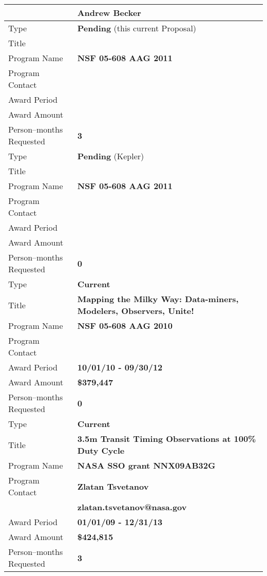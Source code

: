 

\begin{tabular}{lp{3.5in}}
 & {\bf Andrew Becker} \\
\hline

Type & {\bf Pending} (this current Proposal) \\
Title & \\
Program Name & {\bf NSF 05-608 AAG 2011} \\
Program Contact &  \\
Award Period &  \\
Award Amount &  \\
Person--months Requested & {\bf 3} \\
\hline

Type & {\bf Pending} (Kepler) \\
Title & \\
Program Name & {\bf NSF 05-608 AAG 2011} \\
Program Contact & \\
Award Period &  \\
Award Amount &  \\
Person--months Requested & {\bf 0} \\
\hline

Type & {\bf Current}\\
Title & {\bf Mapping the Milky Way: Data-miners, Modelers, Observers, Unite!} \\
Program Name & {\bf NSF 05-608 AAG 2010} \\
Program Contact & \\
Award Period & {\bf 10/01/10 - 09/30/12} \\
Award Amount & {\bf \$379,447} \\
Person--months Requested & {\bf 0} \\
\hline

Type & {\bf Current} \\
Title & {\bf 3.5m Transit Timing Observations at 100\% Duty Cycle} \\
Program Name & {\bf NASA SSO grant NNX09AB32G} \\
Program Contact & {\bf Zlatan Tsvetanov} \\ & {\bf zlatan.tsvetanov@nasa.gov} \\
Award Period & {\bf 01/01/09 - 12/31/13} \\
Award Amount & {\bf \$424,815} \\
Person--months Requested & {\bf 3} \\
\hline



\end{tabular}
